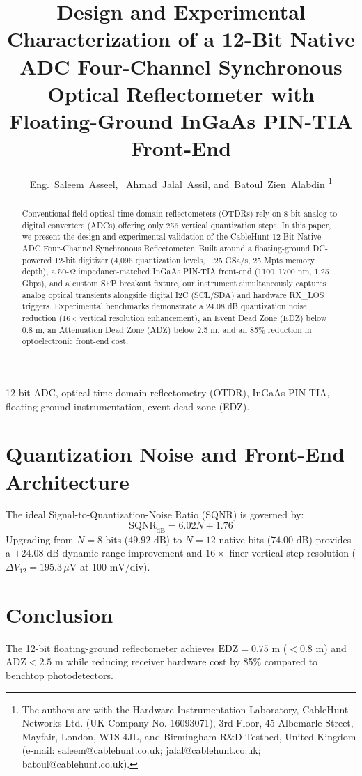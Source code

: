 \documentclass[journal]{IEEEtran}
\begin{document}
\title{Design and Experimental Characterization of a 12-Bit Native ADC Four-Channel Synchronous Optical Reflectometer with Floating-Ground InGaAs PIN-TIA Front-End}

\author{Eng.~Saleem~Asseel,~ Ahmad~Jalal~Assil, and~Batoul~Zien~Alabdin%
\thanks{The authors are with the Hardware Instrumentation Laboratory, CableHunt Networks Ltd. (UK Company No. 16093071), 3rd Floor, 45 Albemarle Street, Mayfair, London, W1S 4JL, and Birmingham R\&D Testbed, United Kingdom (e-mail: saleem@cablehunt.co.uk; jalal@cablehunt.co.uk; batoul@cablehunt.co.uk).}}

\maketitle

\begin{abstract}
Conventional field optical time-domain reflectometers (OTDRs) rely on 8-bit analog-to-digital converters (ADCs) offering only 256 vertical quantization steps. In this paper, we present the design and experimental validation of the CableHunt 12-Bit Native ADC Four-Channel Synchronous Reflectometer. Built around a floating-ground DC-powered 12-bit digitizer (4,096 quantization levels, 1.25 GSa/s, 25 Mpts memory depth), a 50-$\Omega$ impedance-matched InGaAs PIN-TIA front-end (1100--1700 nm, 1.25 Gbps), and a custom SFP breakout fixture, our instrument simultaneously captures analog optical transients alongside digital I2C (SCL/SDA) and hardware RX\_LOS triggers. Experimental benchmarks demonstrate a 24.08 dB quantization noise reduction (16$\times$ vertical resolution enhancement), an Event Dead Zone (EDZ) below 0.8 m, an Attenuation Dead Zone (ADZ) below 2.5 m, and an 85\% reduction in optoelectronic front-end cost.
\end{abstract}

\begin{IEEEkeywords}
12-bit ADC, optical time-domain reflectometry (OTDR), InGaAs PIN-TIA, floating-ground instrumentation, event dead zone (EDZ).
\end{IEEEkeywords}

\section{Quantization Noise and Front-End Architecture}
The ideal Signal-to-Quantization-Noise Ratio (SQNR) is governed by:
\begin{equation}
\text{SQNR}_{\text{dB}} = 6.02 N + 1.76
\end{equation}
Upgrading from $N=8$ bits ($49.92\text{ dB}$) to $N=12$ native bits ($74.00\text{ dB}$) provides a $+24.08\text{ dB}$ dynamic range improvement and $16\times$ finer vertical step resolution ($\Delta V_{12} = 195.3\,\mu\text{V}$ at $100\text{ mV/div}$).

\section{Conclusion}
The 12-bit floating-ground reflectometer achieves $\text{EDZ} = 0.75\text{ m}$ ($<0.8\text{ m}$) and $\text{ADZ} < 2.5\text{ m}$ while reducing receiver hardware cost by 85\% compared to benchtop photodetectors.
\end{document}
